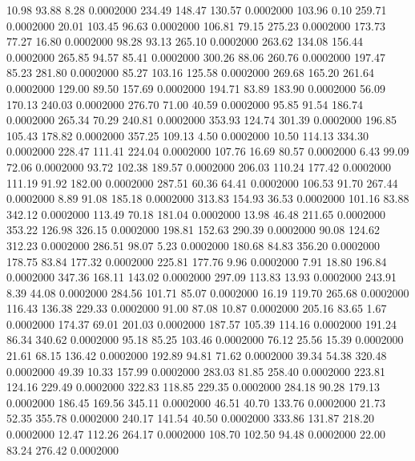   10.98   93.88    8.28   0.0002000
 234.49  148.47  130.57   0.0002000
 103.96    0.10  259.71   0.0002000
  20.01  103.45   96.63   0.0002000
 106.81   79.15  275.23   0.0002000
 173.73   77.27   16.80   0.0002000
  98.28   93.13  265.10   0.0002000
 263.62  134.08  156.44   0.0002000
 265.85   94.57   85.41   0.0002000
 300.26   88.06  260.76   0.0002000
 197.47   85.23  281.80   0.0002000
  85.27  103.16  125.58   0.0002000
 269.68  165.20  261.64   0.0002000
 129.00   89.50  157.69   0.0002000
 194.71   83.89  183.90   0.0002000
  56.09  170.13  240.03   0.0002000
 276.70   71.00   40.59   0.0002000
  95.85   91.54  186.74   0.0002000
 265.34   70.29  240.81   0.0002000
 353.93  124.74  301.39   0.0002000
 196.85  105.43  178.82   0.0002000
 357.25  109.13    4.50   0.0002000
  10.50  114.13  334.30   0.0002000
 228.47  111.41  224.04   0.0002000
 107.76   16.69   80.57   0.0002000
   6.43   99.09   72.06   0.0002000
  93.72  102.38  189.57   0.0002000
 206.03  110.24  177.42   0.0002000
 111.19   91.92  182.00   0.0002000
 287.51   60.36   64.41   0.0002000
 106.53   91.70  267.44   0.0002000
   8.89   91.08  185.18   0.0002000
 313.83  154.93   36.53   0.0002000
 101.16   83.88  342.12   0.0002000
 113.49   70.18  181.04   0.0002000
  13.98   46.48  211.65   0.0002000
 353.22  126.98  326.15   0.0002000
 198.81  152.63  290.39   0.0002000
  90.08  124.62  312.23   0.0002000
 286.51   98.07    5.23   0.0002000
 180.68   84.83  356.20   0.0002000
 178.75   83.84  177.32   0.0002000
 225.81  177.76    9.96   0.0002000
   7.91   18.80  196.84   0.0002000
 347.36  168.11  143.02   0.0002000
 297.09  113.83   13.93   0.0002000
 243.91    8.39   44.08   0.0002000
 284.56  101.71   85.07   0.0002000
  16.19  119.70  265.68   0.0002000
 116.43  136.38  229.33   0.0002000
  91.00   87.08   10.87   0.0002000
 205.16   83.65    1.67   0.0002000
 174.37   69.01  201.03   0.0002000
 187.57  105.39  114.16   0.0002000
 191.24   86.34  340.62   0.0002000
  95.18   85.25  103.46   0.0002000
  76.12   25.56   15.39   0.0002000
  21.61   68.15  136.42   0.0002000
 192.89   94.81   71.62   0.0002000
  39.34   54.38  320.48   0.0002000
  49.39   10.33  157.99   0.0002000
 283.03   81.85  258.40   0.0002000
 223.81  124.16  229.49   0.0002000
 322.83  118.85  229.35   0.0002000
 284.18   90.28  179.13   0.0002000
 186.45  169.56  345.11   0.0002000
  46.51   40.70  133.76   0.0002000
  21.73   52.35  355.78   0.0002000
 240.17  141.54   40.50   0.0002000
 333.86  131.87  218.20   0.0002000
  12.47  112.26  264.17   0.0002000
 108.70  102.50   94.48   0.0002000
  22.00   83.24  276.42   0.0002000
